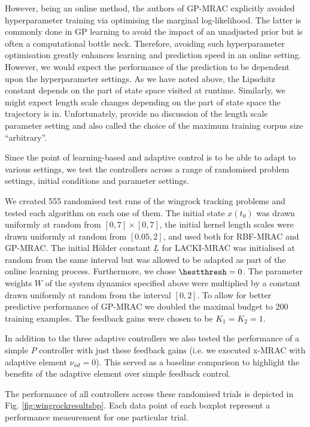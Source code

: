 However, being an online method, the authors of GP-MRAC explicitly avoided hyperparameter training via optimising the marginal log-likelihood. The latter is commonly done in GP learning \cite{GPbook:2006} to avoid the impact of an unadjusted prior but is often a computational bottle neck. Therefore, avoiding such hyperparameter optimisation greatly enhances learning and prediction speed in an online setting. However, we would expect the performance of the prediction to be dependent upon the hyperparameter settings. As we have noted above, the Lipschitz constant depends on the part of state space visited at runtime. Similarly, we might expect length scale changes depending on the part of state space the trajectory is in. Unfortunately, \cite{Chowdhary2013,ChowdharyCDC2013,chowdharyacc2013} provide no discussion of the length scale parameter setting and also called the choice of the maximum training corpus size ``arbitrary''. 

Since the point of learning-based and adaptive control is to be able to adapt to various settings, we test the controllers across a range of randomised problem settings, initial conditions and parameter settings.

We created 555 randomised test runs of the wingrock tracking problems and tested each algorithm on each one of them. The initial state $x(t_0)$ was drawn uniformly at random from $[0,7] \times [0,7]$, the initial kernel length scales were drawn uniformly at random from $[0.05,2]$, and used both for RBF-MRAC and GP-MRAC. The initial H\"older constant $\underline L$ for LACKI-MRAC was initialised at random from the same interval but was allowed to be adapted as part of the online learning process. Furthermore, we chose $\hestthresh =0$. The parameter weights $W$ of the system dynamics specified above were multiplied by a constant drawn uniformly at random from the interval $[0,2]$. To allow for better predictive performance of GP-MRAC we doubled the maximal budget to 200 training examples. 
The feedback gains were chosen to be $K_1=K_2=1$. 

In addition to the three adaptive controllers we also tested the performance of a simple $P$ controller with just these feedback gains (i.e. we executed x-MRAC with adaptive element $\nu_{ad}=0$). This served as a baseline comparison to highlight the benefits of the adaptive element over simple feedback control.

The performance of all controllers across these randomised trials is depicted in Fig. \ref{fig:wingrockresultsbp}. Each data point of each boxplot represent a performance measurement for one particular trial.

